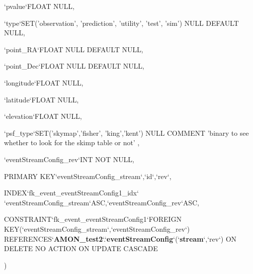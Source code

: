 {{\begin{DoxyParamCaption}
\item[{`pvalue`F\-L\-O\-A\-T}]{N\-U\-L\-L, }
\item[{`type`S\-E\-T('observation', 'prediction', 'utility', 'test', 'sim') N\-U\-L\-L D\-E\-F\-A\-U\-L\-T}]{N\-U\-L\-L, }
\item[{`point\-\_\-\-R\-A`F\-L\-O\-A\-T N\-U\-L\-L D\-E\-F\-A\-U\-L\-T}]{N\-U\-L\-L, }
\item[{`point\-\_\-\-Dec`F\-L\-O\-A\-T N\-U\-L\-L D\-E\-F\-A\-U\-L\-T}]{N\-U\-L\-L, }
\item[{`longitude`F\-L\-O\-A\-T}]{N\-U\-L\-L, }
\item[{`latitude`F\-L\-O\-A\-T}]{N\-U\-L\-L, }
\item[{`elevation`F\-L\-O\-A\-T}]{N\-U\-L\-L, }
\item[{`psf\-\_\-type`S\-E\-T('skymap','fisher', 'king','kent') N\-U\-L\-L C\-O\-M\-M\-E\-N\-T 'binary to see whether to look for the skimp table or not'}]{, }
\item[{`event\-Stream\-Config\-\_\-rev`I\-N\-T N\-O\-T}]{N\-U\-L\-L, }
\item[{P\-R\-I\-M\-A\-R\-Y }]{K\-E\-Y`event\-Stream\-Config\-\_\-stream`,`id`,`rev`, }
\item[{I\-N\-D\-E\-X`fk\-\_\-event\-\_\-event\-Stream\-Config1\-\_\-idx`}]{`event\-Stream\-Config\-\_\-stream`\-A\-S\-C,`event\-Stream\-Config\-\_\-rev`\-A\-S\-C, }
\item[{C\-O\-N\-S\-T\-R\-A\-I\-N\-T`fk\-\_\-event\-\_\-event\-Stream\-Config1`F\-O\-R\-E\-I\-G\-N K\-E\-Y(`event\-Stream\-Config\-\_\-stream`,`event\-Stream\-Config\-\_\-rev`) R\-E\-F\-E\-R\-E\-N\-C\-E\-S`{\bf A\-M\-O\-N\-\_\-test2}`.`{\bf event\-Stream\-Config}`(`{\bf stream}`,`rev`) O\-N D\-E\-L\-E\-T\-E N\-O A\-C\-T\-I\-O\-N O\-N U\-P\-D\-A\-T\-E}]{C\-A\-S\-C\-A\-D\-E}
\end{DoxyParamCaption}
)}}\label{db__mc__build_8sql_acbd1fd683d4ac62d62bece4d450f6bb0}

